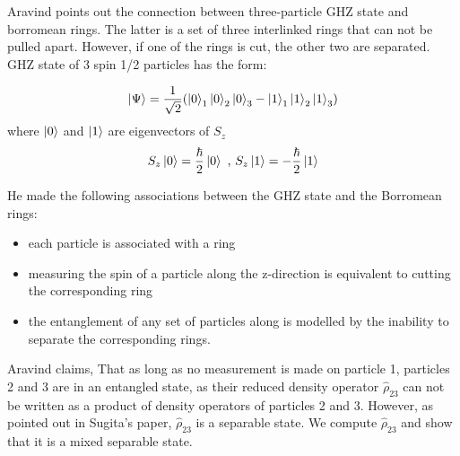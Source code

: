 \documentclass{article}
\begin{document}
\section{}
Aravind points out the connection between three-particle GHZ state and borromean rings. The latter is a set of three interlinked rings that can not be pulled apart. However, if one of the rings is cut, the other two are separated. GHZ state of 3 spin 1/2 particles has the form:

\[
\ket{\Psi} = \frac{1}{\sqrt{2}} (\ket{0}_1\ket{0}_2\ket{0}_3 - \ket{1}_1\ket{1}_2\ket{1}_3)
\]
where $\ket{0}$ and $\ket{1}$ are eigenvectors of $S_z$
\[
S_z\ket{0} = \frac{\hbar}{2}\ket{0} \text{ , }
S_z\ket{1} = -\frac{\hbar}{2}\ket{1}
\]


He made the following associations between the GHZ state and the Borromean rings:

\begin{itemize}
    \item each particle is associated with a ring
    \item measuring the spin of a particle along the z-direction is equivalent to cutting the corresponding ring
    \item the entanglement of any set of particles along is modelled by the inability to separate the corresponding rings.
\end{itemize}
Aravind claims, That as long as no measurement is made on particle 1, particles 2 and 3 are in an entangled state, as their reduced density operator $\hat{\rho}_{23}$ can not be written as a product of density operators of particles 2 and 3. However, as pointed out in Sugita's paper, $\hat{\rho}_{23}$ is a separable state. We compute $\hat{\rho}_{23}$ and show that it is a mixed separable state. 
\end{document}
